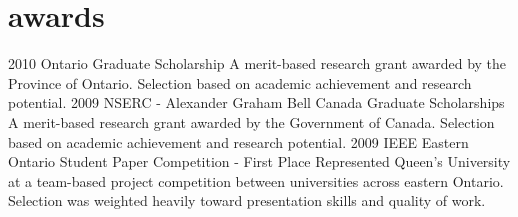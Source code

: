 \section{awards}

\begin{entrylist}
\entry
{2010}
{Ontario Graduate Scholarship}
{}
{A merit-based research grant awarded by the Province of Ontario. Selection based on academic achievement and research potential. }
\entry
{2009}
{NSERC - Alexander Graham Bell Canada Graduate Scholarships}
{}
{A merit-based research grant awarded by the Government of Canada. Selection based on academic achievement and research potential.}
\entry
{2009}
{IEEE Eastern Ontario Student Paper Competition - First Place}
{}
{Represented Queen’s University at a team-based project competition between universities across eastern Ontario. Selection was weighted heavily toward presentation skills and quality of work. }

\end{entrylist}
